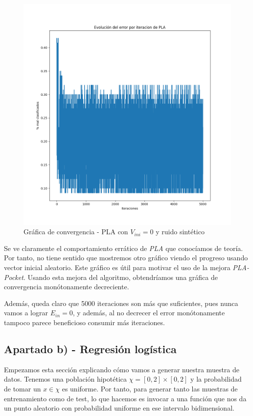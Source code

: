 \documentclass[11pt]{article}
\begin{document}
\begin{figure}[H]
    \centering
    \includegraphics[scale=0.4]{grafica_convergencia_pla_ruido_cero}
    \caption{Gráfica de convergencia - PLA con $V_{ini} = 0$ y ruido sintético}
\end{figure}

Se ve claramente el comportamiento errático de \emph{PLA} que conocíamos de teoría. Por tanto, no tiene sentido que mostremos otro gráfico viendo el progreso usando vector inicial aleatorio. Este gráfico es útil para motivar el uso de la mejora \emph{PLA-Pocket}. Usando esta mejora del algoritmo, obtendríamos una gráfica de convergencia monótonamente decreciente.

Además, queda claro que 5000 iteraciones son más que suficientes, pues nunca vamos a lograr $E_{in} = 0$, y además, al no decrecer el error monótonamente tampoco parece beneficioso consumir más iteraciones.

\pagebreak
\subsection{Apartado b) - Regresión logística}

Empezamos esta sección explicando cómo vamos a generar nuestra muestra de datos. Tenemos una población hipotética $\chi = [0, 2] \times [0, 2]$ y la probabilidad de tomar un $x \in \chi$ es uniforme. Por tanto, para generar tanto las muestras de entrenamiento como de test, lo que hacemos es invocar a una función que nos da un punto aleatorio con probabilidad uniforme en ese intervalo bidimensional.
\end{document}

